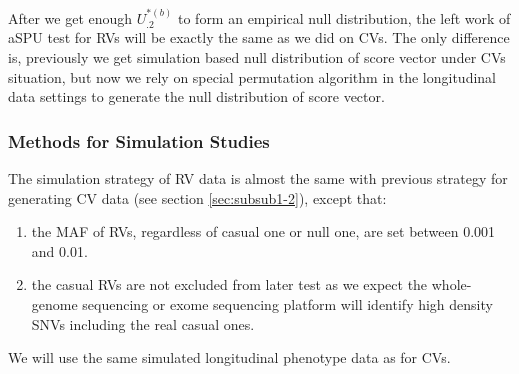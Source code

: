 \documentclass[12pt]{article}
\begin{document}
After we get enough $U_{.2}^{ *(b) }$ to form an empirical null distribution, the left work of aSPU test for RVs will be exactly the same as we did on CVs. The only difference is, previously we get simulation based null distribution of score vector under CVs situation, but now we rely on special permutation algorithm in the longitudinal data settings to generate the null distribution of score vector.

\subsubsection{Methods for Simulation Studies}\label{sec:subsub2-2}
The simulation strategy of RV data is almost the same with previous strategy for generating CV data (see section \ref{sec:subsub1-2}), except that:
\begin{enumerate}
\item the MAF of RVs, regardless of casual one or null one, are set between 0.001 and 0.01.
\item the casual RVs are not excluded from later test as we expect the whole-genome sequencing or exome sequencing platform will identify high density SNVs including the real casual ones.
\end{enumerate}
We will use the same simulated longitudinal phenotype data as for CVs.\\\\


\end{document}
